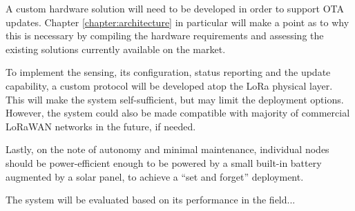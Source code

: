 A custom hardware solution will need to be developed in order to support OTA updates. Chapter \ref{chapter:architecture} in particular will make a point as to why this is necessary by compiling the hardware requirements and assessing the existing solutions currently available on the market.

To implement the sensing, its configuration, status reporting and the update capability, a custom protocol will be developed atop the LoRa physical layer. This will make the system self-sufficient, but may limit the deployment options. However, the system could also be made compatible with majority of commercial LoRaWAN networks in the future, if needed.

Lastly, on the note of autonomy and minimal maintenance, individual nodes should be power-efficient enough to be powered by a small built-in battery augmented by a solar panel, to achieve a ``set and forget'' deployment.

The system will be evaluated based on its performance in the field...
